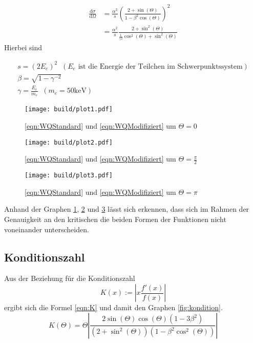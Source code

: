 \begin{align}
    \frac{\mathrm{d}\sigma}{\mathrm{d}\Omega} &= \frac{\alpha^2}{s} \left(\frac{2+\sin(\Theta)}{1-\beta^2 \cos(\Theta)}\right)^2\label{eqn:WQStandard}\\
&= \frac{\alpha^2}{s}\frac{2+\sin^2(\Theta)}{\frac{1}{\gamma^2}\cos^2(\Theta)+\sin^2(\Theta)}\label{eqn:WQModifiziert}
\end{align}
Hierbei sind

\begin{gather}
  s=(2E_e)^2 \;\;(E_e \text{ ist die Energie der Teilchen im Schwerpunktssystem})\nonumber\\
  \beta=\sqrt{1-\gamma^{-2}}\nonumber\\
  \gamma=\frac{E_e}{m_e}\;\; (m_e=50\si{\kilo\electronvolt}) \nonumber
\end{gather}


\begin{figure}
  \centering
  \texttt{[image: build/plot1.pdf]}
  \caption{\eqref{eqn:WQStandard} und \eqref{eqn:WQModifiziert} um $\Theta = 0$}
  \label{fig:t0}
\end{figure}

\begin{figure}
  \centering
  \texttt{[image: build/plot2.pdf]}
  \caption{\eqref{eqn:WQStandard} und \eqref{eqn:WQModifiziert} um $\Theta = \frac{\pi}{2}$}
  \label{fig:tpi2}
\end{figure}

\begin{figure}
  \centering
  \texttt{[image: build/plot3.pdf]}
  \caption{\eqref{eqn:WQStandard} und \eqref{eqn:WQModifiziert} um $\Theta = \pi$}
  \label{fig:tpi}
\end{figure}
\noindent Anhand der Graphen \ref{fig:t0}, \ref{fig:tpi2} und \ref{fig:tpi} lässt sich erkennen, dass sich im Rahmen der Genauigkeit an den kritischen die beiden Formen der Funktionen nicht voneinander unterscheiden.

\subsection{Konditionszahl}
Aus der Beziehung für die Konditionszahl
\begin{equation}
  K(x):=\left|x\frac{f'(x)}{f(x)}\right|
\end{equation}
ergibt sich die Formel \eqref{eqn:K} und damit den Graphen \ref{fig:kondition}.
\begin{equation}
  K(\Theta)= \Theta  \left|\frac{2\sin(\Theta)\cos(\Theta)\left(1-3\beta^2\right)}{\left(2+\sin^2(\Theta)\right)\left(1-\beta^2\cos^2(\Theta)\right)}\right| \label{eqn:K}
\end{equation}

